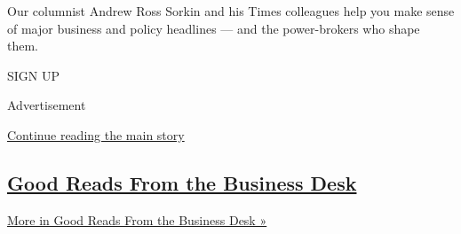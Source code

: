 Our columnist Andrew Ross Sorkin and his Times colleagues help you make
sense of major business and policy headlines --- and the power-brokers
who shape them.

SIGN UP

Advertisement

\protect\hyperlink{after-mid1}{Continue reading the main story}

\hypertarget{good-reads-from-the-business-desk}{%
\subsection{\texorpdfstring{\href{/spotlight/editors-picks-business}{Good
Reads From the Business
Desk}}{Good Reads From the Business Desk}}\label{good-reads-from-the-business-desk}}

\href{/spotlight/editors-picks-business}{More in Good Reads From the
Business Desk »}

